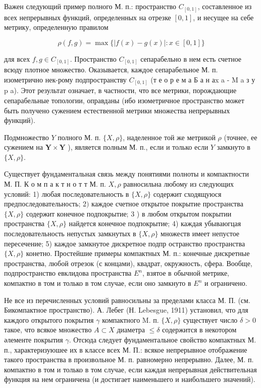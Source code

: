 \documentclass[10pt]{article}
\begin{document}
Важен следующий пример полного М. п.: пространство $C_{[0,1]}$, составленное из всех непрерывных функций, определенных на отрезке $[0,1]$, и несущее на себе метрику, определенную правилом



\[

\rho(f, g)=\max \{|f(x)-g(x)|: x \in[0,1]\}

\]



для всех $f, g \in C_{[0,1]}$. Пространство $C_{[0,1]}$ сепарабельно в нем есть счетное всюду плотное множество. Оказывается, каждое сепарабельное М. п. изометрично нек-рому подпространству $C_{[0,1]}$ (т е о р е м а Б а н аx a - M a з у p a). Этот результат означает, в частности, что все метрики, порождающие сепарабельные топологии, оправданы (ибо изометричное пространство может быть получено сужением естественной метрики множества непрерывных функций).



Подмножество $Y$ полного М. п. $\{X, \rho\}$, наделенное той же метрикой $\rho$ (точнее, ее сужением на $\boldsymbol{Y} \times \boldsymbol{Y}$ ), является полным М. п., если и только если $Y$ замкнуто в $\{X, \rho\}$.



Существует фундаментальная связь между понятиями полноты и компактности М. П. К о м п а к т н о т т М. п. $X, \rho$ равносильна любому из следующих условий: 1) любая последовательность в $\{X, \rho\}$ содержит сходящуюся предпоследовательность; 2$)$ каждое счетное открытое покрытие пространства $\{X, \rho\}$ содержит конечное подпокрытие; 3 ) в любом открытом покрытии пространства $\{X, \rho\}$ найдется конечное подпокрытие; 4) каждая убываюгцая последовательность непустых замкнутых в $\{X, \rho\}$ множеств имеет непустое пересечение; 5) каждое замкнутое дискретное подпр остранство пространства $\{X, \rho\}$ конетно. Простейшие примеры компактных М. п.: конечные дискретные пространства, любой отрезок (с концами), квадрат, окружность, сфера. Вообще, подпространство евклидова пространства $E^{n}$, взятое в обычной метрике, компактно в том и только в том случае, если оно замкнуто в $E^{n}$ и ограничено.



Не все из перечисленных условий равносильны за пределами класса М. П. (см. Бикомпактное пространство). А. Лебег (Н. Lebesgue, 1911) установил, что для каждого открытого покрытия $\gamma$ компактного M. п. $\{X, \rho\}$ существует число $\delta>0$ такое, что всякое множество $A \subset X$ диаметра $\leqslant \delta$ содержится в некотором әлементе покрытия $\gamma$. Отсюда следует фундаментальное свойство компактных М. п., характеризуюшее их в классе всех М. П.: всякое непрерывное отображение такого пространства в произвольное М. п. равномерно непрерывно. Далее, М. п. компактно в том и только в том случае, если каждая непрерывная действительная функция на нем ограничена (и достигает наименьшего и наибольшего значений).
\end{document}

